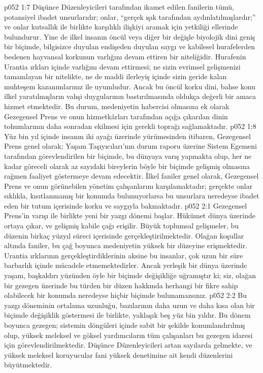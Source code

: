 \vs p052 1:7 Düşünce Düzenleyicileri tarafından ikamet edilen fanilerin tümü, potansiyel ibadet unsurlarıdır; onlar, “gerçek ışık tarafından aydınlatılmışlardır;” ve onlar kutsallık ile birlikte karşılıklı ilişkiyi aramak için yetkiliği ellerinde bulundurur. Yine de ilkel insanın öncül veya diğer bir değişle biyolojik dini geniş bir biçimde, bilgisizce duyulan endişeden duyulan saygı ve kabilesel hurafelerden beslenen hayvansal korkunun varlığını devam ettiren bir niteliğidir. Hurafenin Urantia ırkları içinde varlığını devam ettirmesi; ne sizin evrimsel gelişmenizi tamamlayan bir nitelikte, ne de maddi ilerleyiş içinde sizin geride kalan muhteşem kazanımlarınız ile uyumludur. Ancak bu öncül korku dini, bahse konu ilkel yaratılmışların vahşi duygularının bastırılmasında oldukça değerli bir amaca hizmet etmektedir. Bu durum, medeniyetin habercisi olmasına ek olarak Gezegensel Prens ve onun hizmetkârları tarafından açığa çıkarılan dinin tohumlarının daha sonradan ekilmesi için gerekli toprağı sağlamaktadır.
\vs p052 1:8 Yüz bin yıl içinde insanın iki ayağı üzerinde yürümesinden itibaren, Gezegensel Prens genel olarak; Yaşam Taşıyıcıları’nın durum raporu üzerine Sistem Egemeni tarafından görevlendirilen bir biçimde, bu dünyaya varış yapmakta olup, her ne kadar göreceli olarak az sayıdaki bireylerin böyle bir biçimde gelişmiş olmasına rağmen faaliyet göstermeye devam edecektir. İlkel faniler genel olarak, Gezegensel Prens ve onun görünebilen yönetim çalışanlarını karşılamaktadır; gerçekte onlar sıklıkla, kısıtlanmamış bir konumda bulunuyorlarsa bu unsurlara neredeyse ibadet eden bir tutum içerisinde korku ve saygıyla bakmaktadır.
\vs p052 2:1 Gezegensel Prens’in varışı ile birlikte yeni bir yazgı dönemi başlar. Hükümet dünya üzerinde ortaya çıkar, ve gelişmiş kabile çağı erişilir. Büyük toplumsal gelişmeler, bu düzenin birkaç yüzyıl süreci içerisinde gerçekleştirilmektedir. Olağan koşullar altında faniler, bu çağ boyunca medeniyetin yüksek bir düzeyine erişmektedir. Urantia ırklarının gerçekleştirdiklerinin aksine bu insanlar, çok uzun bir süre barbarlık içinde mücadele etmemektedirler. Ancak yerleşik bir dünya üzerinde yaşam, başkaldırı yüzünden öyle bir biçimde değişikliğe uğramıştır ki; siz, olağan bir gezegen üzerinde bu türden bir düzen hakkında herhangi bir fikre sahip olabilecek bir konumda neredeyse hiçbir biçimde bulunamazsınız.
\vs p052 2:2 Bu yazgı döneminin ortalama uzunluğu, bazılarının daha uzun ve daha kısa olan bir biçimde değişiklik göstermesi ile birlikte, yaklaşık beş yüz bin yıldır. Bu dönem boyunca gezegen; sistemin döngüleri içinde sabit bir şekilde konumlandırılmış olup, yüksek meleksel ve göksel yardımcıların tüm çalışanları bu gezegen idaresi için görevlendirilmektedir. Düşünce Düzenleyicileri artan sayılarda gelmekte, ve yüksek meleksel koruyucular fani yüksek denetimine ait kendi düzenlerini büyütmektedir.
